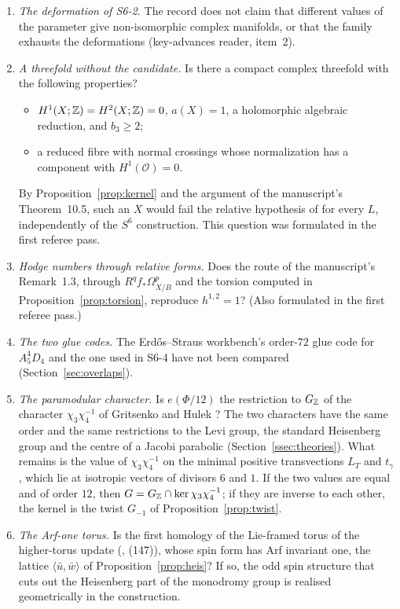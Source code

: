 \begin{enumerate}[label=\arabic*.,ref=\arabic*]
\item\label{q:deformation} \emph{The deformation of S6-2.} The record does not claim that different values of the parameter give non-isomorphic complex manifolds, or that the family exhausts the deformations (key-advances reader, item~2).
\item\label{q:threefold} \emph{A threefold without the candidate.} Is there a compact complex threefold with the following properties?
\begin{itemize}
\item $H^1(X;\mathbb{Z})=H^2(X;\mathbb{Z})=0$, $a(X)=1$, a holomorphic algebraic reduction, and $b_3\ge2$;
\item a reduced fibre with normal crossings whose normalization has a component with $H^1(\mathcal O)=0$.
\end{itemize}
By Proposition~\ref{prop:kernel} and the argument of the manuscript's Theorem~10.5, such an $X$ would fail the relative hypothesis of \cite{CDP20} for every $L$, independently of the $S^6$ construction. This question was formulated in the first referee pass.
\item\label{q:hodge} \emph{Hodge numbers through relative forms.} Does the route of the manuscript's Remark~1.3, through $R^qf_*\Omega^p_{X/B}$ and the torsion computed in Proposition~\ref{prop:torsion}, reproduce $h^{1,2}=1$? (Also formulated in the first referee pass.)
\item\label{q:glue} \emph{The two glue codes.} The Erdős--Straus workbench's order-$72$ glue code for $A_5^4D_4$ and the one used in S6-4 have not been compared (Section~\ref{sec:overlaps}).
\item\label{q:paramodular} \emph{The paramodular character.} Is $e(\Phi/12)$ the restriction to $G_{\mathbb{Z}}$ of the character $\chi_3\chi_4^{-1}$ of Gritsenko and Hulek \cite[Lemma~1.1]{GritsenkoHulek}? The two characters have the same order and the same restrictions to the Levi group, the standard Heisenberg group and the centre of a Jacobi parabolic (Section~\ref{ssec:theories}). What remains is the value of $\chi_3\chi_4^{-1}$ on the minimal positive transvections $L_T$ and $t_\gamma$, which lie at isotropic vectors of divisors $6$ and $1$. If the two values are equal and of order $12$, then $G=G_{\mathbb{Z}}\cap\ker\chi_3\chi_4^{-1}$; if they are inverse to each other, the kernel is the twist $G_{-1}$ of Proposition~\ref{prop:twist}.
\item\label{q:arfone} \emph{The Arf-one torus.} Is the first homology of the Lie-framed torus of the higher-torus update (, (147)), whose spin form has Arf invariant one, the lattice $\langle\bar u,\bar w\rangle$ of Proposition~\ref{prop:heis}? If so, the odd spin structure that cuts out the Heisenberg part of the monodromy group is realised geometrically in the construction.

\end{enumerate}
